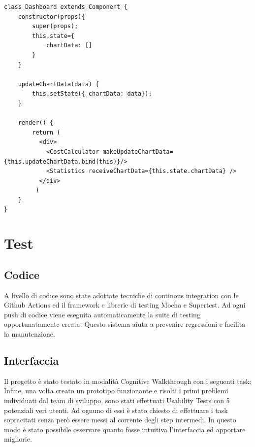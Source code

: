 \documentclass{report}
\begin{document}
\begin{lstlisting}
class Dashboard extends Component {
	constructor(props){
		super(props);
		this.state={
			chartData: []
		}
	}

	updateChartData(data) {
		this.setState({ chartData: data});
	}

	render() {
		return (
		  <div>
		    <CostCalculator makeUpdateChartData= {this.updateChartData.bind(this)}/>
		    <Statistics receiveChartData={this.state.chartData} />
		  </div>
		 )
	}
}
\end{lstlisting}

\section{Test}
\subsection{Codice}
A livello di codice sono state adottate tecniche di continous integration con le Github Actions ed il framework e librerie di testing
Mocha e Supertest.
Ad ogni push di codice viene eseguita automaticamente la suite di testing opportunatamente creata.
Questo sistema aiuta a prevenire regressioni e facilita la manutenzione.
\subsection{Interfaccia}
Il progetto è stato testato in modalità Cognitive Walkthrough con i seguenti task:
Infine, una volta creato un prototipo funzionante e risolti i primi problemi individuati dal team di sviluppo,
sono stati effettuati Usability Tests con 5 potenziali veri utenti. Ad ognuno di essi è stato chiesto di effettuare i task
sopracitati senza però essere messi al corrente degli step intermedi. In questo modo è stato possibile osservare quanto fosse
intuitiva l'interfaccia ed apportare migliorie.
\end{document}
